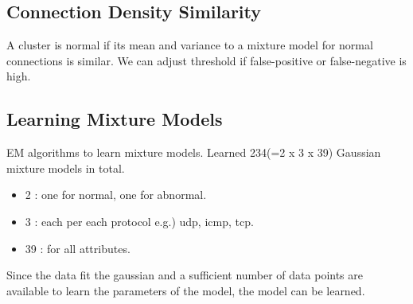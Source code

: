 \subsection{Connection Density Similarity}
\label{subsec:densitysimilarity}
A cluster is normal if its mean and variance to a mixture model for normal connections is similar. 
We can adjust threshold if false-positive or false-negative is high. 

\subsection{Learning Mixture Models}
\label{subsec:learningsimilarity}
EM algorithms to learn mixture models.
Learned 234(=2 x 3 x 39) Gaussian mixture models in total.
\begin{itemize}
\item 2 : one for normal, one for abnormal.
\item 3 : each per each protocol e.g.) udp, icmp, tcp.
\item 39 : for all attributes.
\end{itemize}

Since the data fit the gaussian and a sufficient number of data points are available to learn the parameters of the model, the model can be learned.


